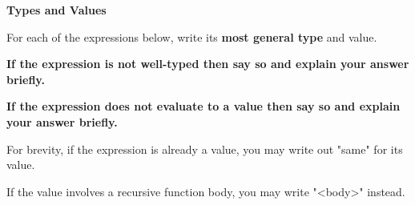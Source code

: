 


\textbf{Types and Values}

For each of the expressions below, write its \textbf{most general type} and value.

\textbf{If the expression is not well-typed then say so and explain your answer briefly.}

\textbf{If the expression does not evaluate to a value then say so and explain your answer briefly.}

For brevity, if the expression is already a value, you may write out "same" for its value.

If the value involves a recursive function body, you may write "<body>" instead.

